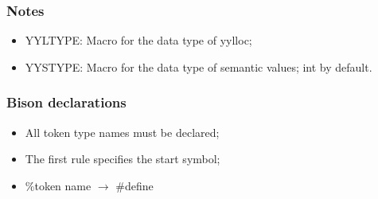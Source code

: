 \documentclass[14pt]{beamer}
\begin{document}
\begin{frame}[fragile]
	
	\frametitle{Notes}	
	
	\begin{itemize}
		\item YYLTYPE: Macro for the data type of yylloc;
		\item YYSTYPE: Macro for the data type of semantic values; int by default.
	\end{itemize}
	
\end{frame}

	\begin{frame}
\end{frame}

\begin{frame}[fragile]
	
	\frametitle{Bison declarations}	
	
	\begin{itemize}
		\item All token type names must be declared;
		\item The first rule specifies the start symbol;
		\item \%token name $\rightarrow$ \#define
	\end{itemize}
	
\end{frame}

	
\end{document}
